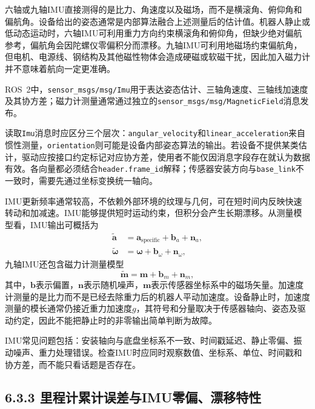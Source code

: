 \documentclass[UTF8,zihao=-4]{ctexart}
\newcommand{\vect}[1]{\bm{#1}}
\begin{document}
六轴或九轴IMU直接测得的是比力、角速度以及磁场，而不是横滚角、俯仰角和偏航角。设备给出的姿态通常是内部算法融合上述测量后的估计值。机器人静止或低动态运动时，六轴IMU可利用重力方向约束横滚角和俯仰角，但缺少绝对偏航参考，偏航角会因陀螺仪零偏积分而漂移。九轴IMU可利用地磁场约束偏航角，但电机、电源线、钢结构及其他磁性物体会造成硬磁或软磁干扰，因此加入磁力计并不意味着航向一定更准确。

ROS~2中，\texttt{sensor\_msgs/msg/Imu}用于表达姿态估计、三轴角速度、三轴线加速度及其协方差\cite{ros2imu}；磁力计测量通常通过独立的\texttt{sensor\_msgs/msg/MagneticField}消息发布\cite{ros2magneticfield}。

读取\texttt{Imu}消息时应区分三个层次：\texttt{angular\_velocity}和\texttt{linear\_acceleration}来自惯性测量，\texttt{orientation}则可能是设备内部姿态算法的输出。若设备不提供某类估计，驱动应按接口约定标记对应协方差，使用者不能仅因消息字段存在就认为数据有效。各向量都必须结合\texttt{header.frame\_id}解释；传感器安装方向与\texttt{base\_link}不一致时，需要先通过坐标变换统一轴向。

IMU更新频率通常较高，不依赖外部环境的纹理与几何，可在短时间内反映快速转动和加减速。IMU能够提供短时运动约束，但积分会产生长期漂移。从测量模型看，IMU输出可概括为
\begin{align}
  \widetilde{\vect{a}} &= \vect{a}_{\mathrm{specific}}+\vect{b}_a+\vect{n}_a,\\
  \widetilde{\vect{\omega}} &= \vect{\omega}+\vect{b}_{\omega}+\vect{n}_{\omega},
  \label{eq:imu-measurement}
\end{align}
九轴IMU还包含磁力计测量模型
\begin{equation}
  \widetilde{\vect{m}}=\vect{m}+\vect{b}_m+\vect{n}_m,
  \label{eq:magnetometer-measurement}
\end{equation}
其中，$\vect{b}$表示偏置，$\vect{n}$表示随机噪声，$\vect{m}$表示传感器坐标系中的磁场矢量。加速度计测量的是比力而不是已经去除重力后的机器人平动加速度。设备静止时，加速度测量的模长通常仍接近重力加速度$g$，其符号和分量取决于传感器轴向、姿态及驱动约定，因此不能把静止时的非零输出简单判断为故障。

IMU常见问题包括：安装轴向与底盘坐标系不一致、时间戳延迟、静止零偏、振动噪声、重力处理错误。检查IMU时应同时观察数值、坐标系、单位、时间戳和协方差，而不能只看话题是否存在。

\subsection*{6.3.3 里程计累计误差与IMU零偏、漂移特性}
\end{document}
